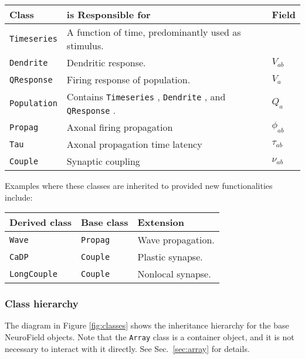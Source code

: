 \documentclass[12pt,a4paper]{article}
\newcommand{\type}[1]{{\small\small\tt #1} }
\begin{document}
\begin{tabular}{l l l}
	Class&is Responsible for&Field\\
	\hline
	\type{Timeseries}&A function of time, predominantly used as stimulus.&\\
	\type{Dendrite}&Dendritic response.&$V_{ab}$\\
	\type{QResponse}&Firing response of population.&$V_a$\\
	\type{Population}&Contains \type{Timeseries}, \type{Dendrite}, and \type{QResponse}.&$Q_a$\\
	\type{Propag}&Axonal firing propagation&$\phi_{ab}$\\
	\type{Tau}&Axonal propagation time latency&$\tau_{ab}$\\
	\type{Couple}&Synaptic coupling&$\nu_{ab}$
\end{tabular}

Examples where these classes are inherited to provided new functionalities include:

\begin{tabular}{l l l}
	Derived class&Base class&Extension\\
	\hline
	\type{Wave}&\type{Propag}&Wave propagation.\\
	\type{CaDP}&\type{Couple}&Plastic synapse.\\
	\type{LongCouple}&\type{Couple}&Nonlocal synapse.
\end{tabular}

\subsubsection{Class hierarchy}
The diagram in Figure \ref{fig:classes} shows the inheritance hierarchy for the base NeuroField objects. Note that the \type{Array} class is a container object, and it is not necessary to interact with it directly. See Sec.~\ref{sec:array} for details.
\end{document}
